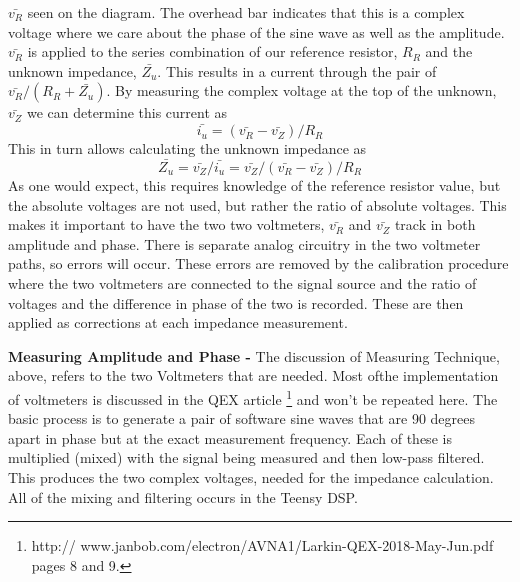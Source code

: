  \(\bar{v_R}\) seen on the diagram. 
The overhead bar indicates that this is a complex voltage where we care about the phase of the sine wave as well as the amplitude.  \(\bar{v_R}\) is applied to the series combination of our reference resistor, \(R_R\) and the unknown impedance, \(\bar{Z_u}\).  This results in a current through the pair  of \(\bar{v_R}/(R_R + \bar{Z_u})\).  By measuring the complex voltage at the top of the unknown, \(\bar{v_Z}\) we can determine this current as
\begin{equation}
 \bar{i_u}=(\bar{v_R} -\bar{v_Z})/R_R
\end{equation}
 This in turn allows calculating the unknown impedance as
\begin{equation}
 \bar{Z_u} = \bar{v_Z}/\bar{i_u}
                    = \bar{v_Z}/(\bar{v_R}-\bar{v_Z})/R_R
\end{equation}
As one would expect, this requires knowledge of the reference resistor value, but the absolute voltages are not used, but rather the ratio of absolute voltages.  This makes it important to have the two two voltmeters, \(\bar{v_R}\) and \(\bar{v_Z}\) track in both amplitude and phase.  There is separate analog circuitry in the two voltmeter paths, so errors will occur.  These errors are removed by the calibration procedure where the two voltmeters are connected to the signal source and the ratio  of voltages and the difference in phase of the two is recorded.   These are then applied as corrections at each impedance measurement.

\textbf{Measuring Amplitude and Phase - }The discussion of Measuring Technique, above, refers to the two Voltmeters that are needed.  Most ofthe  implementation of voltmeters is discussed in the QEX article
%
\footnote{http:// www.janbob.com/electron/AVNA1/Larkin-QEX-2018-May-Jun.pdf pages 8 and 9.}
%
and won't be repeated here.  The basic process is to generate a pair of software sine waves that are 90 degrees apart in phase but at the exact measurement frequency.  Each of these is multiplied (mixed) with the signal being measured and then low-pass filtered.  This produces the two complex voltages, needed for the impedance calculation.  All of the mixing and filtering occurs in the Teensy DSP.